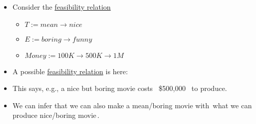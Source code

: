 \begin{itemize}
    \item Consider the \href{doc/1 math/Seven Sketches in Compositionality/Chapter 4: Co-design/2 Enriched profunctors/1 Feasibility relationships as Bool-profunctors/1 Feasilibiliy relation}{feasibility relation}
          \begin{itemize}

            \item $T:=\boxed{mean\rightarrow nice}$
            \item $E:=\boxed{boring\rightarrow funny}$
            \item $Money:=\boxed{100 K\rightarrow 500 K \rightarrow 1M}$
          \end{itemize}
    \item A possible \href{doc/1 math/Seven Sketches in Compositionality/Chapter 4: Co-design/2 Enriched profunctors/1 Feasibility relationships as Bool-profunctors/1 Feasilibiliy relation}{feasibility relation} is here:

    \item This says, e.g., a nice but boring movie costs \, \$500,000 \, to produce.
    \item We can infer that we can also make a mean/boring movie with \,what we can produce nice/boring movie\,.

  \end{itemize}
